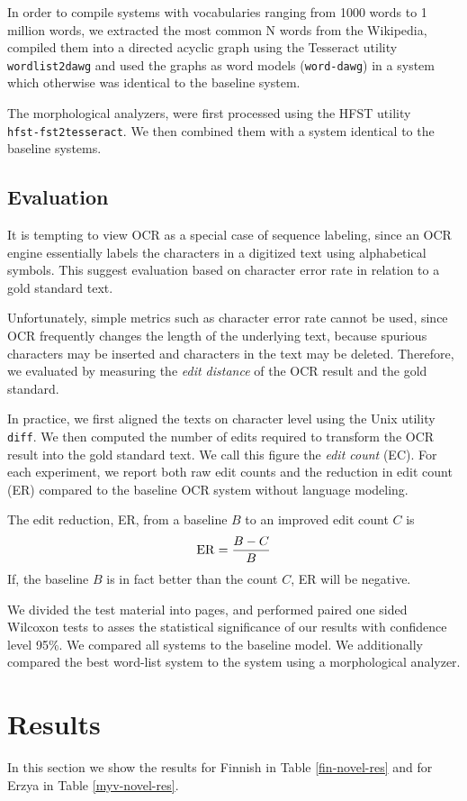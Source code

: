 \documentclass[b5paper]{article}
\begin{document}
In order to compile systems with vocabularies ranging from 1000 words
to 1 million words, we extracted the most common N words from the
Wikipedia, compiled them into a directed acyclic graph using the
Tesseract utility {\tt wordlist2dawg} and used the graphs as word
models ({\tt word-dawg}) in a system which otherwise was identical to
the baseline system.

The morphological analyzers, were first processed using the HFST
utility\\{\tt hfst-fst2tesseract}. We then combined them with a system
identical to the baseline systems. 

\subsection{Evaluation}
It is tempting to view OCR as a special case of sequence labeling,
since an OCR engine essentially labels the characters in a digitized
text using alphabetical symbols. This suggest
evaluation based on character error rate in relation to a gold
standard text.

Unfortunately, simple metrics such as character error rate cannot be
used, since OCR frequently changes the length of the underlying text,
because spurious characters may be inserted and characters in the text
may be deleted. Therefore, we evaluated by measuring the {\it edit
  distance} \cite{levenshtein66} of the OCR result and the gold
standard.

In practice, we first aligned the texts on character level using the
Unix utility {\tt diff}. We then computed the number of edits required
to transform the OCR result into the gold standard text. We call this
figure the {\it edit count} (EC). For each experiment, we report both
raw edit counts and the reduction in edit count (ER) compared to the
baseline OCR system without language modeling.

The edit reduction, ER, from a baseline $B$ to an improved edit
count $C$ is
$${\rm ER} = \frac{B - C}{B}$$
If, the baseline $B$ is in fact better than the count $C$, ER will be
negative.

We divided the test material into pages, and performed paired one
sided Wilcoxon tests to asses the statistical significance of our
results with confidence level 95\%. We compared all systems to
the baseline model. We additionally compared the best word-list system
to the system using a morphological analyzer.

\section{Results}
\label{res}
In this section we show the results for Finnish in Table
\ref{fin-novel-res} and for Erzya in Table
\ref{myv-novel-res}. 
\end{document}
